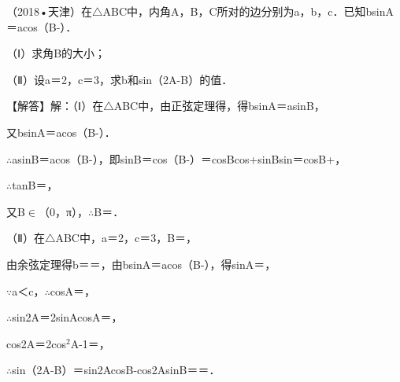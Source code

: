 \begin{question}
（2018•天津）在$\triangle$ABC中，内角A，B，C所对的边分别为a，b，c．已知bsinA＝acos（B-\allowbreak{}）．\par
（Ⅰ）求角B的大小；\par
（Ⅱ）设a＝2，c＝3，求b和sin（2A-B）的值．\par
\begin{solution}
【解答】解：（Ⅰ）在$\triangle$ABC中，由正弦定理得\allowbreak{}，得bsinA＝asinB，\par
又bsinA＝acos（B-\allowbreak{}）．\par
$\therefore$asinB＝acos（B-\allowbreak{}），即sinB＝cos（B-\allowbreak{}）＝cosBcos\allowbreak{}+sinBsin\allowbreak{}＝\allowbreak{}cosB+\allowbreak{}，\par
$\therefore$tanB＝\allowbreak{}，\par
又B$\in$（0，π），$\therefore$B＝\allowbreak{}．\par
（Ⅱ）在$\triangle$ABC中，a＝2，c＝3，B＝\allowbreak{}，\par
由余弦定理得b＝\allowbreak{}＝\allowbreak{}，由bsinA＝acos（B-\allowbreak{}），得sinA＝\allowbreak{}，\par
$\because$a＜c，$\therefore$cosA＝\allowbreak{}，\par
$\therefore$sin2A＝2sinAcosA＝\allowbreak{}，\par
cos2A＝2cos$^{2}$A-1＝\allowbreak{}，\par
$\therefore$sin（2A-B）＝sin2AcosB-cos2AsinB＝\allowbreak{}＝\allowbreak{}．\par
\end{solution}
\end{question}

